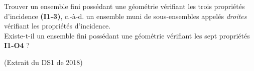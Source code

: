 \documentclass[a4paper,11pt,reqno]{amsart}
\begin{document}
\begin{exo}

  Trouver un ensemble fini possédant une géométrie vérifiant les trois propriétés d'incidence \textbf{(I1-3)}, c.-à-d. un ensemble muni de sous-ensembles appelés \emph{droites} vérifiant les propriétés d'incidence.\\
  Existe-t-il un ensemble fini possédant une géométrie vérifiant les sept propriétés \textbf{I1-O4} ?
\end{exo}

\begin{exo} (Extrait du DS1 de 2018)
\end{exo}
\end{document}

